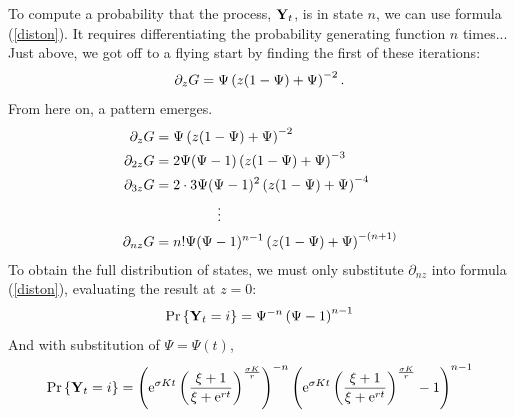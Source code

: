 To compute a probability that the process, ${{\bf Y}_t}$, is in state $n$, we can use formula (\ref{diston}). It requires differentiating the probability generating function $n$ times... Just above, we got off to a flying start by finding the first of these iterations:
$$\partial_z G = \Psi \left( z(1-\Psi) + \Psi\right)^{-2}.$$
From here on, a pattern emerges.
\begin{align*}
\partial_z G &= \Psi \left( z(1-\Psi) + \Psi\right)^{-2}\\
\partial_{2z} G &= 2\Psi (\Psi -1 ) \left( z(1-\Psi) + \Psi\right)^{-3}\\
\partial_{3z} G &= 2\cdot 3\Psi (\Psi -1 )^{2} \left( z(1-\Psi) + \Psi\right)^{-4}\\
&\hspace{45pt}\vdots\\
\partial_{nz} G &= n!\Psi (\Psi -1 )^{n-1} \left( z(1-\Psi) + \Psi\right)^{-(n+1)}
\end{align*}
To obtain the full distribution of states, we must only substitute $\partial_{nz}$ into formula (\ref{diston}), evaluating the result at $z=0$:
$${\text{Pr}\left\{{{\bf Y}_t} = i\right\}} = \Psi^{-n}\left(\Psi- 1\right)^{n-1}$$ 
And with substitution of $\Psi = \Psi(t)$,
$${\text{Pr}\left\{{{\bf Y}_t} = i\right\}} = \left( {\rm e}^{\sigma K t} \left(\frac{\xi + 1}{\xi + {\rm e}^{rt}}\right)^{\frac{\sigma K}{r}}\right)^{-n}\left( {\rm e}^{\sigma K t} \left(\frac{\xi + 1}{\xi + {\rm e}^{rt}}\right)^{\frac{\sigma K}{r}}- 1\right)^{n-1}$$
